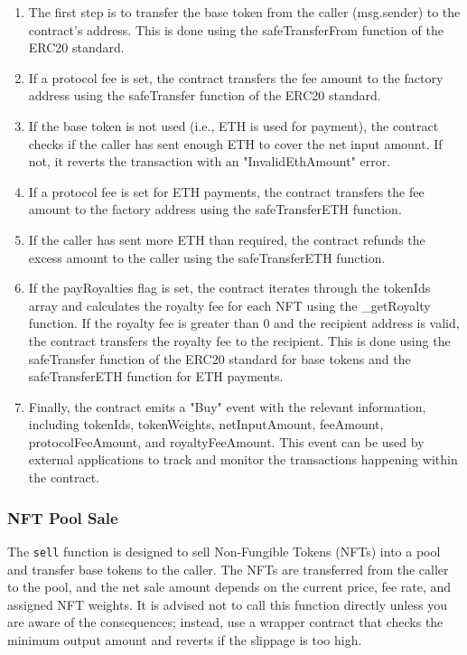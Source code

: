 \begin{enumerate}
\def\labelenumi{\arabic{enumi}.}
\item
  The first step is to transfer the base token from the caller
  (msg.sender) to the contract's address. This is done using the
  safeTransferFrom function of the ERC20 standard.
\item
  If a protocol fee is set, the contract transfers the fee amount to the
  factory address using the safeTransfer function of the ERC20 standard.
\item
  If the base token is not used (i.e., ETH is used for payment), the
  contract checks if the caller has sent enough ETH to cover the net
  input amount. If not, it reverts the transaction with an
  "InvalidEthAmount" error.
\item
  If a protocol fee is set for ETH payments, the contract transfers the
  fee amount to the factory address using the safeTransferETH function.
\item
  If the caller has sent more ETH than required, the contract refunds
  the excess amount to the caller using the safeTransferETH function.
\item
  If the payRoyalties flag is set, the contract iterates through the
  tokenIds array and calculates the royalty fee for each NFT using the
  \_getRoyalty function. If the royalty fee is greater than 0 and the
  recipient address is valid, the contract transfers the royalty fee to
  the recipient. This is done using the safeTransfer function of the
  ERC20 standard for base tokens and the safeTransferETH function for
  ETH payments.
\item
  Finally, the contract emits a "Buy" event with the relevant
  information, including tokenIds, tokenWeights, netInputAmount,
  feeAmount, protocolFeeAmount, and royaltyFeeAmount. This event can be
  used by external applications to track and monitor the transactions
  happening within the contract.
\end{enumerate}

\hypertarget{nft-pool-sale}{%
\subsubsection{NFT Pool Sale}\label{nft-pool-sale}}

The \texttt{sell} function is designed to sell Non-Fungible Tokens
(NFTs) into a pool and transfer base tokens to the caller. The NFTs are
transferred from the caller to the pool, and the net sale amount depends
on the current price, fee rate, and assigned NFT weights. It is advised
not to call this function directly unless you are aware of the
consequences; instead, use a wrapper contract that checks the minimum
output amount and reverts if the slippage is too high.

